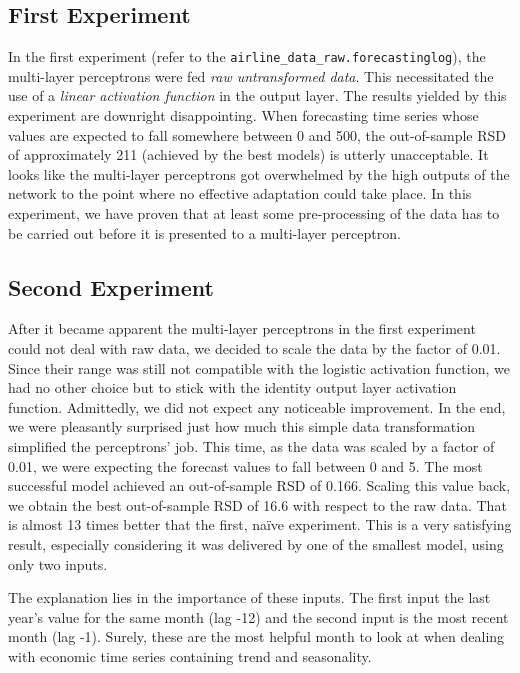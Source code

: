 \subsection{First Experiment}

In the first experiment (refer to the \texttt{airline\_data\_raw.forecastinglog}), the multi-layer perceptrons were fed \textit{raw untransformed data}. This necessitated the use of a \textit{linear activation function} in the output layer. The results yielded by this experiment are downright disappointing. When forecasting time series whose values are expected to fall somewhere between 0 and 500, the out-of-sample RSD of approximately 211 (achieved by the best models) is utterly unacceptable. It looks like the multi-layer perceptrons got overwhelmed by the high outputs of the network to the point where no effective adaptation could take place. In this experiment, we have proven that at least some pre-processing of the data has to be carried out before it is presented to a multi-layer perceptron.

\subsection{Second Experiment}

After it became apparent the multi-layer perceptrons in the first experiment could not deal with raw data, we decided to scale the data by the factor of 0.01. Since their range was still not compatible with the logistic activation function, we had no other choice but to stick with the identity output layer activation function. Admittedly, we did not expect any noticeable improvement. In the end, we were pleasantly surprised just how much this simple data transformation simplified the perceptrons' job. This time, as the data was scaled by a factor of 0.01, we were expecting the forecast values to fall between 0 and 5. The most successful model achieved an out-of-sample RSD of 0.166. Scaling this value back, we obtain the best out-of-sample RSD of 16.6 with respect to the raw data. That is almost 13 times better that the first, na\"{i}ve experiment. This is a very satisfying result, especially considering it was delivered by one of the smallest model, using only two inputs.

The explanation lies in the importance of these inputs. The first input the last year's value for the same month (lag -12) and the second input is the most recent month (lag -1). Surely, these are the most helpful month to look at when dealing with economic time series containing trend and seasonality.


